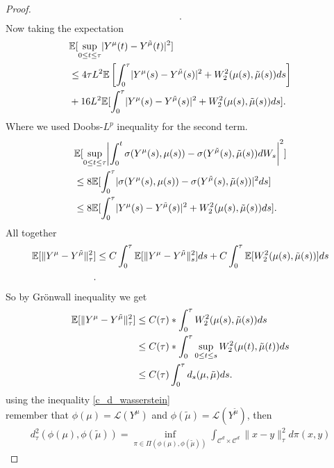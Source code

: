 \begin{proof}
\begin{align*}
 .\end{align*}
 Now taking the expectation 
 \begin{align*}
   &\mathbb{E}[\sup_{0\le t \le \tau }\lvert Y^{\mu }(t) - Y^{\tilde{\mu } }(t)\rvert^2] \\
   &\le 4\tau  L^2 \mathbb{E}\left[\int_0^{\tau } \lvert Y^{\mu }(s) - Y^{\tilde{\mu } }(s)  \rvert^2 + W_2^2(\mu(s) ,\tilde{\mu}(s) ) ds \right]\\
   &+ 16 L^2 \mathbb{E}[\int_0^{\tau } \lvert Y^{\mu}(s) - Y^{\tilde{\mu } }(s)  \rvert^2 + W_2^2(\mu(s),\tilde{\mu }(s) )  ds]
 .\end{align*}
 Where we used Doobs-$L^{p} $ inequality for the second term.
 \begin{align*}
   &\E[\sup_{0\le t\le \tau }\abs*{\int_0^{t} \sigma(Y^{\mu }(s),\mu(s) ) - \sigma (Y^{\tilde{\mu}}(s),\tilde{\mu}(s) ) dW_s}^2] \\
   &\le 8 \E[\int_0^{\tau } \abs{\sigma(Y^{\mu }(s),\mu(s) ) - \sigma (Y^{\tilde{\mu}}(s),\tilde{\mu}(s) )}^2 ds]\\
   &\le 8 \E[\int_0^{\tau } \abs{Y^{\mu}(s) - Y^{\tilde{\mu } }(s)  }^2 + W_2^2(\mu(s),\tilde{\mu }(s) )  ds]
 .\end{align*}
 All together 
 \begin{align*}
   \mathbb{E}[\|Y^{\mu } - Y^{\tilde{\mu } }\|_{\tau}^2] &\le C \int_0^{\tau } \mathbb{E}[\|Y^{\mu } - Y^{\tilde{\mu } }\|_s^2] ds + C \int_0^{\tau } \mathbb{E}[W_2^2(\mu(s),\tilde{\mu }(s) )]  ds  \\
 .\end{align*}
 So by Grönwall inequality we get 
 \begin{align*}
   \mathbb{E}[\|Y^{\mu } - Y^{\tilde{\mu } }\|_{\tau}^2] &\le C(\tau )* \int_0^{\tau }  W_2^2(\mu(s) ,\tilde{\mu }(s) ) ds \\                                               
                                                 &\le C(\tau )* \int_0^{\tau }  \sup_{0\le t \le s} W_2^2(\mu(t) ,\tilde{\mu }(t) ) ds \\                                              
                                                 &\le C(\tau ) \int_0^{\tau } d_s(\mu ,\tilde{\mu } )ds
 .\end{align*}
 using  the inequality \autoref{c_d_wasserstein}\\[1ex]
 remember that $\phi(\mu) = \mathcal{L}(Y^{\mu } )$ and $\phi(\tilde{\mu } ) = \mathcal{L}(Y^{\tilde{\mu } } )$, then
 \begin{align*}
   d_{\tau }^2(\phi(\mu ),\phi(\tilde{\mu } )) =  \inf_{\pi  \in  \Pi(\phi(\mu) ,\phi(\tilde{\mu } ))} \int_{\mathcal{C}^{d} \times  \mathcal{C}^{d}   } \|x-y\|_\tau^2 d\pi(x,y)

\end{align*}
\end{proof}
